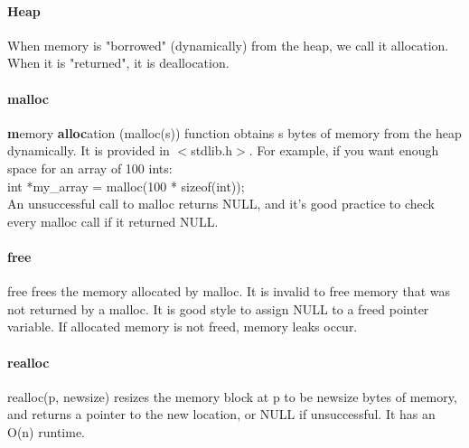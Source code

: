 \documentclass[10pt,letter]{article}
\begin{document}
\paragraph{Heap} When memory is "borrowed" (dynamically) from the heap, we call it allocation. When it is "returned", it is deallocation. 

\paragraph{malloc} \textbf{m}emory \textbf{alloc}ation (malloc(s)) function obtains s bytes of memory from the heap dynamically. It is provided in $<$stdlib.h$>$. For example, if you want enough space for an array of 100 ints: \\int *my\_array = malloc(100 * sizeof(int)); \\An unsuccessful call to malloc returns NULL, and it's good practice to check every malloc call if it returned NULL. 

\paragraph{free} free frees the memory allocated by malloc. It is invalid to free memory that was not returned by a malloc. It is good style to assign NULL to a freed pointer variable. If allocated memory is not freed, memory leaks occur. 

\paragraph{realloc} realloc(p, newsize) resizes the memory block at p to be newsize bytes of memory, and returns a pointer to the new location, or NULL if unsuccessful. It has an O(n) runtime. 
\end{document}

